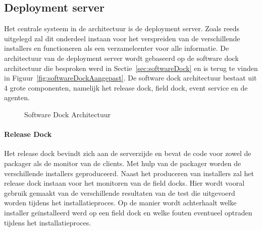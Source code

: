 \subsection{Deployment server}
Het centrale systeem in de architectuur is de deployment server.
Zoals reeds uitgelegd zal dit onderdeel instaan voor het verspreiden van de verschillende installers en functioneren als een verzamelcenter voor alle informatie.
De architectuur van de deployment server wordt gebaseerd op de software dock architectuur die besproken werd in Sectie~\vref{sec:softwareDock} en is terug te vinden in Figuur~\vref{fig:softwareDockAangepast}.
De software dock architectuur bestaat uit 4 grote componenten, namelijk het release dock, field dock, event service en de agenten.

\begin{figure}[!ht]
\centering
{}
\caption{Software Dock Architectuur \citep{hall1999cooperative}}
\label{fig:softwareDockAangepast}
\end{figure}

\paragraph{Release Dock}
Het release dock bevindt zich aan de serverzijde en bevat de code voor zowel de packager als de monitor van de clients.
Met hulp van de packager worden de verschillende installers geproduceerd.
Naast het produceren van installers zal het release dock instaan voor het monitoren van de field docks.
Hier wordt vooral gebruik gemaakt van de verschillende resultaten van de test die uitgevoerd worden tijdens het installatieproces.
Op de manier wordt achterhaalt welke installer geïnstalleerd werd op een field dock en welke fouten eventueel optraden tijdens het installatieproces.

